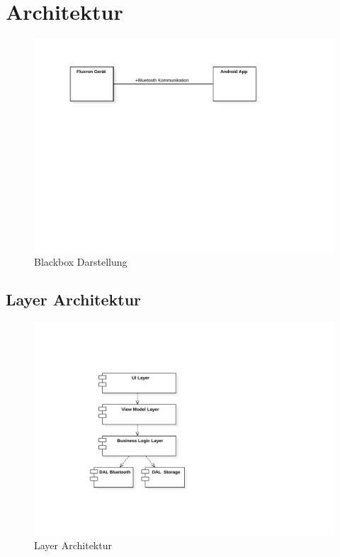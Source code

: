 \section{Architektur}
\label{sec:Architektur}

\begin{figure}[H]
    \begin{center}
        \includegraphics[trim=30 420 140 60,clip,width=\textwidth]{design/res/blackbox}
    \end{center}
    \caption{Blackbox Darstellung}
\end{figure}

\subsection{Layer Architektur}
\begin{figure}[H]
    \begin{center}
        \includegraphics[trim=-100 130 140 110,clip,width=\textwidth]{design/res/layers}
    \end{center}
    \caption{Layer Architektur}
\end{figure}


